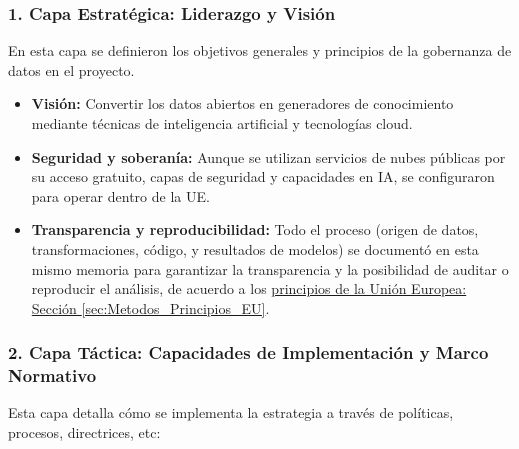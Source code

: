 \subsubsection*{1. Capa Estratégica: Liderazgo y Visión}

En esta capa se definieron los objetivos generales y principios de la gobernanza de datos en el proyecto.

\begin{itemize}
	\item \textbf{Visión:} Convertir los datos abiertos en generadores de conocimiento mediante técnicas de inteligencia artificial y tecnologías cloud.
	
	\item \textbf{Seguridad y soberanía:} Aunque se utilizan servicios de nubes públicas por su acceso gratuito, capas de seguridad y capacidades en IA, se configuraron para operar dentro de la UE.
	
	\item \textbf{Transparencia y reproducibilidad:} Todo el proceso (origen de datos, transformaciones, código, y resultados de modelos) se documentó en esta mismo memoria para garantizar la transparencia y la posibilidad de auditar o reproducir el análisis, de acuerdo a los \hyperref[sec:Metodos_Principios_EU]{principios de la Unión Europea: Sección \ref*{sec:Metodos_Principios_EU}}.
\end{itemize}


\subsubsection*{2. Capa Táctica: Capacidades de Implementación y Marco Normativo}

Esta capa detalla cómo se implementa la estrategia a través de políticas, procesos, directrices, etc:


